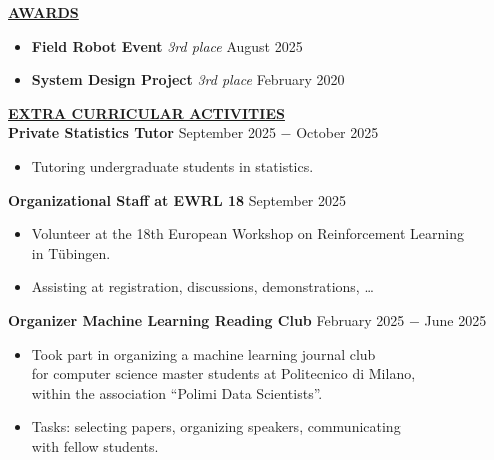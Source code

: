 \documentclass{article}
\begin{document}

\noindent \textbf{\underline{AWARDS}}
\begin{itemize}[noitemsep,nolistsep,leftmargin=*]
    \item \textbf{Field Robot Event} \textit{3rd place} \hfill August 2025
    \item \textbf{System Design Project} \textit{3rd place} \hfill February 2020 \\
\end{itemize}

\vspace{0.3cm}
\noindent \textbf{\underline{EXTRA CURRICULAR ACTIVITIES}} \\

\noindent \textbf{Private Statistics Tutor} \hfill September 2025 $-$ October 2025
\begin{itemize}[noitemsep,nolistsep,leftmargin=*]
    \item Tutoring undergraduate students in statistics. \\
\end{itemize}

\noindent \textbf{Organizational Staff at EWRL 18} \hfill September 2025
\begin{itemize}[noitemsep,nolistsep,leftmargin=*]
    \item Volunteer at the 18th European Workshop on Reinforcement Learning \\
    in Tübingen.
    \item Assisting at registration, discussions, demonstrations, \ldots \\
\end{itemize}

\noindent \textbf{Organizer Machine Learning Reading Club} \hfill February 2025 $-$ June 2025
\begin{itemize}[noitemsep,nolistsep,leftmargin=*]
    \item Took part in organizing a machine learning journal club \\
    for computer science master students at Politecnico di Milano, \\
    within the association ``Polimi Data Scientists''.
    \item Tasks: selecting papers, organizing speakers, communicating \\
    with fellow students.\\
\end{itemize}
\end{document}
